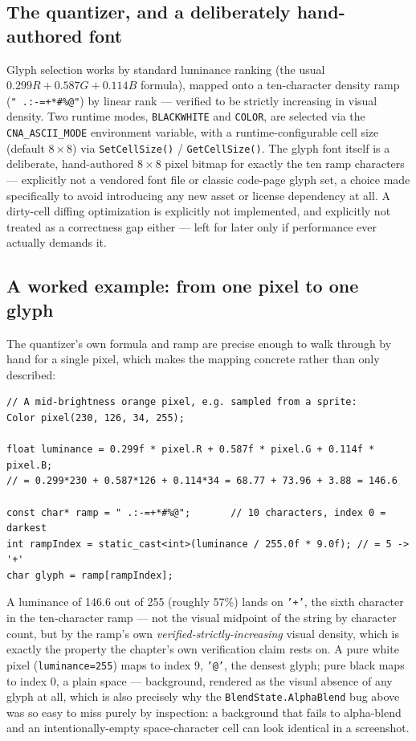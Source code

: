 \subsection{The quantizer, and a deliberately hand-authored font}

Glyph selection works by standard luminance ranking (the usual $0.299R + 0.587G + 0.114B$
formula), mapped onto a ten-character density ramp (\texttt{" .:-=+*\#\%@"}) by linear rank ---
verified to be strictly increasing in visual density. Two runtime modes,
\texttt{BLACKWHITE} and \texttt{COLOR}, are selected via the \texttt{CNA\_ASCII\_MODE}
environment variable, with a runtime-configurable cell size (default $8\times8$) via
\texttt{SetCellSize()} / \texttt{GetCellSize()}. The glyph font itself is a deliberate,
hand-authored $8\times8$ pixel bitmap for exactly the ten ramp characters --- explicitly not
a vendored font file or classic code-page glyph set, a choice made specifically to avoid
introducing any new asset or license dependency at all. A dirty-cell diffing optimization is
explicitly not implemented, and explicitly not treated as a correctness gap either --- left
for later only if performance ever actually demands it.

\subsection{A worked example: from one pixel to one glyph}

The quantizer's own formula and ramp are precise enough to walk through by hand for a single
pixel, which makes the mapping concrete rather than only described:

\begin{lstlisting}
// A mid-brightness orange pixel, e.g. sampled from a sprite:
Color pixel(230, 126, 34, 255);

float luminance = 0.299f * pixel.R + 0.587f * pixel.G + 0.114f * pixel.B;
// = 0.299*230 + 0.587*126 + 0.114*34 = 68.77 + 73.96 + 3.88 = 146.6

const char* ramp = " .:-=+*#%@";       // 10 characters, index 0 = darkest
int rampIndex = static_cast<int>(luminance / 255.0f * 9.0f); // = 5 -> '+'
char glyph = ramp[rampIndex];
\end{lstlisting}

A luminance of 146.6 out of 255 (roughly 57\%) lands on \texttt{'+'}, the sixth character in
the ten-character ramp --- not the visual midpoint of the string by character count, but by
the ramp's own \emph{verified-strictly-increasing} visual density, which is exactly the
property the chapter's own verification claim rests on. A pure white pixel
(\texttt{luminance=255}) maps to index 9, \texttt{'@'}, the densest glyph; pure black maps to
index 0, a plain space --- background, rendered as the visual absence of any glyph at all,
which is also precisely why the \texttt{BlendState.AlphaBlend} bug above was so easy to miss
purely by inspection: a background that fails to alpha-blend and an intentionally-empty
space-character cell can look identical in a screenshot.

